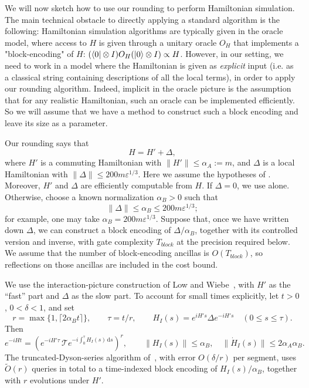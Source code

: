 \documentclass[a4paper,onecolumn,11pt]{quantumarticle}
\theoremstyle{plain}
\newcommand{\eps}{\varepsilon}
\begin{document}
We will now sketch how to use our rounding to perform Hamiltonian simulation. The main technical obstacle to directly applying a standard algorithm is the following: Hamiltonian simulation algorithms are typically given in the oracle model, where access to $H$ is given through a unitary oracle $O_H$ that implements a "block-encoding" of $H$: $(\bra{0}\otimes I)O_H (\ket{0} \otimes I) \propto H$. However, in our setting, we need to work in a model where the Hamiltonian is given as \emph{explicit} input (i.e. as a classical string containing descriptions of all the local terms), in order to apply our rounding algorithm. Indeed, implicit in the oracle picture is the assumption that for any realistic Hamiltonian, such an oracle can be implemented efficiently. So we will assume that we have a method to construct such a block encoding and leave its size as a parameter.

    Our rounding says that
    \[ H = H' + \Delta,\]
    where $H'$ is a commuting Hamiltonian with $\|H'\|\leq\alpha_A:=m$, and $\Delta$ is a local Hamiltonian with $\|\Delta\|\leq 200m\eps^{1/3}$. Here we assume the hypotheses of . Moreover, $H'$ and $\Delta$ are efficiently computable from $H$. If $\Delta=0$, we use  alone. Otherwise, choose a known normalization $\alpha_B>0$ such that
    \[ \|\Delta\|\leq\alpha_B\leq200m\eps^{1/3};\]
    for example, one may take $\alpha_B=200m\eps^{1/3}$. Suppose that, once we have written down $\Delta$, we can construct a block encoding of $\Delta/\alpha_B$, together with its controlled version and inverse, with gate complexity $T_{block}$ at the precision required below. We assume that the number of block-encoding ancillas is $O(T_{block})$, so reflections on those ancillas are included in the cost bound.

    We use the interaction-picture construction of Low and Wiebe~\cite{low2018hamiltonian}, with $H'$ as the ``fast'' part and $\Delta$ as the slow part. To account for small times explicitly, let $t>0$, $0<\delta<1$, and set
    \[
    r=\max\{1,\lceil2\alpha_B t\rceil\},\qquad \tau=t/r,\qquad
    H_I(s)=e^{iH's}\Delta e^{-iH's}\quad(0\leq s\leq\tau).
    \]
    Then
    \[
    e^{-iHt}=\left(e^{-iH'\tau}\,\mathcal{T}e^{-i\int_0^\tau H_I(s)\,\mathrm{d}s}\right)^r,
    \qquad
    \|H_I(s)\|\leq\alpha_B,\quad
    \|\dot H_I(s)\|\leq2\alpha_A\alpha_B.
    \]
    The truncated-Dyson-series algorithm of~\cite[Theorem~3 and Lemma~6]{low2018hamiltonian}, with error $O(\delta/r)$ per segment, uses $\widetilde O(r)$ queries in total to a time-indexed block encoding of $H_I(s)/\alpha_B$, together with $r$ evolutions under $H'$.
\end{document}
